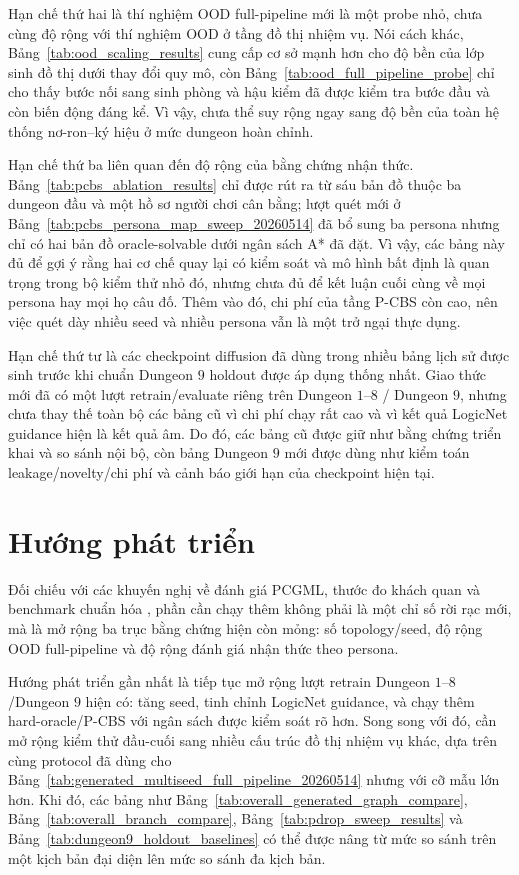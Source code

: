 \documentclass[oneside,a4paper,12pt]{extreport}
\begin{document}
Hạn chế thứ hai là thí nghiệm OOD full-pipeline mới là một probe nhỏ, chưa cùng độ rộng với thí nghiệm OOD ở tầng đồ thị nhiệm vụ. Nói cách khác, Bảng~\ref{tab:ood_scaling_results} cung cấp cơ sở mạnh hơn cho độ bền của lớp sinh đồ thị dưới thay đổi quy mô, còn Bảng~\ref{tab:ood_full_pipeline_probe} chỉ cho thấy bước nối sang sinh phòng và hậu kiểm đã được kiểm tra bước đầu và còn biến động đáng kể. Vì vậy, chưa thể suy rộng ngay sang độ bền của toàn hệ thống nơ-ron--ký hiệu ở mức dungeon hoàn chỉnh.

Hạn chế thứ ba liên quan đến độ rộng của bằng chứng nhận thức. Bảng~\ref{tab:pcbs_ablation_results} chỉ được rút ra từ sáu bản đồ thuộc ba dungeon đầu và một hồ sơ người chơi cân bằng; lượt quét mới ở Bảng~\ref{tab:pcbs_persona_map_sweep_20260514} đã bổ sung ba persona nhưng chỉ có hai bản đồ oracle-solvable dưới ngân sách A* đã đặt. Vì vậy, các bảng này đủ để gợi ý rằng hai cơ chế quay lại có kiểm soát và mô hình bất định là quan trọng trong bộ kiểm thử nhỏ đó, nhưng chưa đủ để kết luận cuối cùng về mọi persona hay mọi họ câu đố. Thêm vào đó, chi phí của tầng P-CBS còn cao, nên việc quét dày nhiều seed và nhiều persona vẫn là một trở ngại thực dụng.

Hạn chế thứ tư là các checkpoint diffusion đã dùng trong nhiều bảng lịch sử được sinh trước khi chuẩn Dungeon $9$ holdout được áp dụng thống nhất. Giao thức mới đã có một lượt retrain/evaluate riêng trên Dungeon $1$--$8$ / Dungeon $9$, nhưng chưa thay thế toàn bộ các bảng cũ vì chi phí chạy rất cao và vì kết quả LogicNet guidance hiện là kết quả âm. Do đó, các bảng cũ được giữ như bằng chứng triển khai và so sánh nội bộ, còn bảng Dungeon $9$ mới được dùng như kiểm toán leakage/novelty/chi phí và cảnh báo giới hạn của checkpoint hiện tại.

\section{Hướng phát triển}
Đối chiếu với các khuyến nghị về đánh giá PCGML, thước đo khách quan và benchmark chuẩn hóa \cite{summerville2018pcgml,beukman2022objective,khalifa2025pcgbenchmark,mota2021dungeon}, phần cần chạy thêm không phải là một chỉ số rời rạc mới, mà là mở rộng ba trục bằng chứng hiện còn mỏng: số topology/seed, độ rộng OOD full-pipeline và độ rộng đánh giá nhận thức theo persona.

Hướng phát triển gần nhất là tiếp tục mở rộng lượt retrain Dungeon $1$--$8$/Dungeon $9$ hiện có: tăng seed, tinh chỉnh LogicNet guidance, và chạy thêm hard-oracle/P-CBS với ngân sách được kiểm soát rõ hơn. Song song với đó, cần mở rộng kiểm thử đầu-cuối sang nhiều cấu trúc đồ thị nhiệm vụ khác, dựa trên cùng protocol đã dùng cho Bảng~\ref{tab:generated_multiseed_full_pipeline_20260514} nhưng với cỡ mẫu lớn hơn. Khi đó, các bảng như Bảng~\ref{tab:overall_generated_graph_compare}, Bảng~\ref{tab:overall_branch_compare}, Bảng~\ref{tab:pdrop_sweep_results} và Bảng~\ref{tab:dungeon9_holdout_baselines} có thể được nâng từ mức so sánh trên một kịch bản đại diện lên mức so sánh đa kịch bản.
\end{document}
